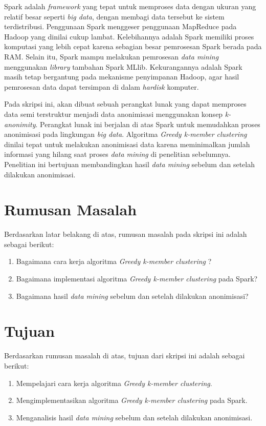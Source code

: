 Spark adalah {\it framework} yang tepat untuk memproses data dengan ukuran yang relatif besar seperti {\it big data}, dengan membagi data tersebut ke sistem terdistribusi. Penggunaan Spark menggeser penggunaan MapReduce pada Hadoop yang dinilai cukup lambat. Kelebihannya adalah Spark memiliki proses komputasi yang lebih cepat karena sebagian besar pemrosesan Spark berada pada RAM. Selain itu, Spark mampu melakukan pemrosesan {\it data mining} menggunakan {\it library} tambahan Spark MLlib. Kekurangannya adalah Spark masih tetap bergantung pada mekanisme penyimpanan Hadoop, agar hasil pemrosesan data dapat tersimpan di dalam {\it hardisk} komputer.

Pada skripsi ini, akan dibuat sebuah perangkat lunak yang dapat memproses data semi terstruktur menjadi data anonimisasi menggunakan konsep {\it k-anonimity}. Perangkat lunak ini berjalan di atas Spark untuk memudahkan proses anonimisasi pada lingkungan {\it big data}. Algoritma {\it Greedy k-member clustering} dinilai tepat untuk melakukan anonimisasi data karena meminimalkan jumlah informasi yang hilang saat proses {\it data mining} di penelitian sebelumnya. Penelitian ini bertujuan membandingkan hasil {\it data mining} sebelum dan setelah dilakukan anonimisasi.

\section{Rumusan Masalah}
\label{sec:rumusan}
Berdasarkan latar belakang di atas, rumusan masalah pada skripsi ini adalah sebagai berikut:
\begin{enumerate}
\item Bagaimana cara kerja algoritma {\it Greedy k-member clustering} ?
\item Bagaimana implementasi algoritma {\it Greedy k-member clustering} pada Spark?
\item Bagaimana hasil {\it data mining} sebelum dan setelah dilakukan anonimisasi?
\end{enumerate}

\section{Tujuan}
\label{sec:tujuan}
Berdasarkan rumusan masalah di atas, tujuan dari skripsi ini adalah sebagai berikut:
\begin{enumerate}
\item Mempelajari cara kerja algoritma {\it Greedy k-member clustering}.
\item Mengimplementasikan algoritma {\it Greedy k-member clustering } pada Spark.
\item Menganalisis hasil {\it data mining} sebelum dan setelah dilakukan anonimisasi.
\end{enumerate}

